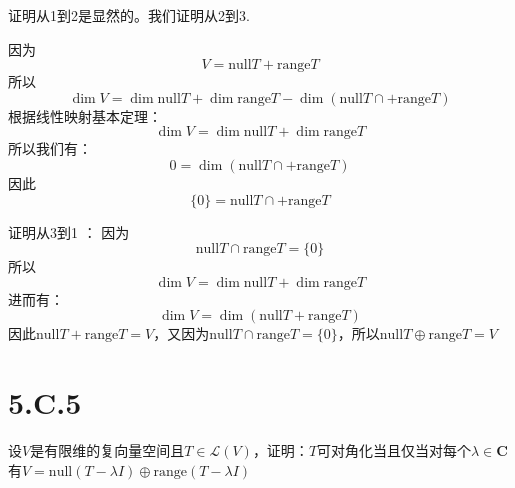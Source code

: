 \documentclass[10pt,a4paper,UTF8]{article}
\begin{document}
\begin{answer}
证明从1到2是显然的。我们证明从2到3.

因为
\[V = \mathrm{null}T + \mathrm{range}T\]
所以
\[\dim V = \dim \mathrm{null}T + \dim \mathrm{range}T - \dim (\mathrm{null}T \cap + \mathrm{range}T)\]
根据线性映射基本定理：
\[\dim V = \dim \mathrm{null}T + \dim \mathrm{range}T\]
所以我们有：
\[0 = \dim (\mathrm{null}T \cap + \mathrm{range}T)\]
因此
\[ \{0\} = \mathrm{null}T \cap + \mathrm{range}T\]

证明从3到1 ：
因为
\[\mathrm{null}T \cap \mathrm{range}T = \{0\}\]
所以
\[\dim V = \dim \mathrm{null}T + \dim \mathrm{range}T\]
进而有：
\[\dim V = \dim (\mathrm{null}T + \mathrm{range}T)\]
因此\(\mathrm{null}T + \mathrm{range}T = V\)，又因为\(\mathrm{null}T \cap \mathrm{range}T = \{0\}\)，所以\(\mathrm{null}T \oplus \mathrm{range}T = V\)
\end{answer}

\section{5.C.5}
\label{sec:org6d8d972}


\begin{problem}
设\(V\)是有限维的复向量空间且\(T\in \mathcal{L}(V)\)，证明：\(T\)可对角化当且仅当对每个\(\lambda \in \mathbf{C}\)有\(V = \mathrm{null}(T-\lambda I) \oplus \mathrm{range}(T-\lambda I)\)
\end{problem}
\end{document}
